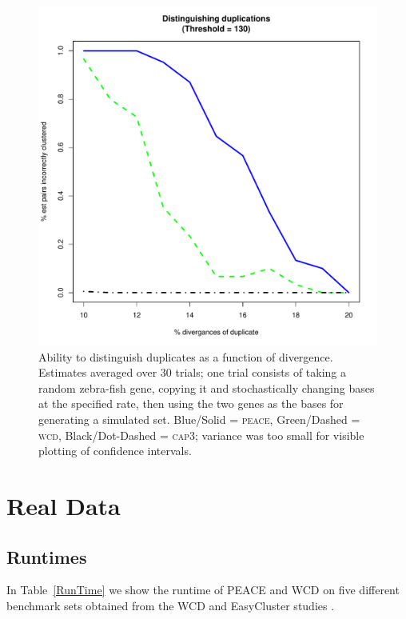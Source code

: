 \documentclass[a4paper,12pt]{article}
\newcommand{\peace} {{\small PEACE}}
\newcommand{\wcd} {{\small WCD}}
\begin{document}
\begin{appendix}
\begin{figure}[tbp]
\centerline{
\includegraphics[scale=0.35]{pics.d/duplicates_130.pdf}
}
\caption{Ability to distinguish duplicates as a function of
  divergence.  Estimates averaged over 30 trials; one trial consists
  of taking a random zebra-fish gene, copying it and stochastically changing bases
  at the specified rate, then using the two genes as the bases for
  generating a simulated set. Blue/Solid = \textsc{peace}, Green/Dashed = \textsc{wcd}, Black/Dot-Dashed = \textsc{cap3};
  variance was too small for visible plotting of
  confidence intervals.}\label{dups130}
\end{figure}

\section{Real Data}

\subsection{Runtimes}

In Table~\ref{RunTime} we show the runtime of \peace\/ and \wcd\/ on
five different benchmark sets obtained from the WCD and EasyCluster
studies \cite{Hazelhurst08a,Picardi09}. 


\end{appendix}
\end{document}
